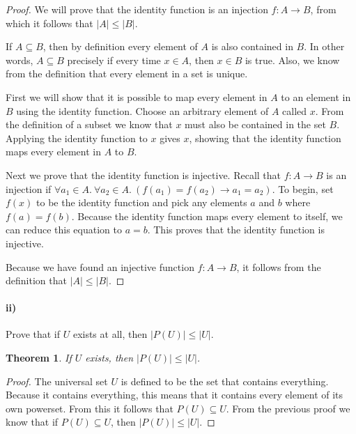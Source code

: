 \documentclass[10pt,letter]{article}
\newtheorem*{thm}{Theorem}
\begin{document}
\begin{proof} We will prove that the identity function is an injection $f : A \rightarrow B$, from which it follows that $|A| \leq |B|$. 

If $A \subseteq B$, then by definition every element of $A$ is also contained in $B$. In other words, $A \subseteq B$ precisely if every time $x \in A$, then $x \in B$ is true. Also, we know from the definition that every element in a set is unique. 

First we will show that it is possible to map every element in $A$ to an element in $B$ using the identity function. Choose an arbitrary element of $A$ called $x$. From the definition of a subset we know that $x$ must also be contained in the set $B$. Applying the identity function to $x$ gives $x$, showing that the identity function maps every element in $A$ to $B$.

Next we prove that the identity function is injective. Recall that $f : A \rightarrow B$ is an injection if $\forall a_1 \in A .\ \forall a_2 \in A .\ (f(a_1) = f(a_2) \rightarrow a_1 = a_2)$. To begin, set $f(x)$ to be the identity function and pick any elements $a$ and $b$ where $f(a) = f(b)$. Because the identity function maps every element to itself, we can reduce this equation to $a = b$. This proves that the identity function is injective. 

Because we have found an injective function $f : A \rightarrow B$, it follows from the definition that $|A| \leq |B|$. 

\end{proof}

\paragraph{ii)} Prove that if $U$ exists at all, then $|P(U)| \leq |U|$.\\

\begin{thm} If $U$ exists, then $|P(U)| \leq |U|$.
\end{thm}

\begin{proof} The universal set $U$ is defined to be the set that contains everything. Because it contains everything, this means that it contains every element of its own powerset. From this it follows that $P(U) \subseteq U$. From the previous proof we know that if $P(U) \subseteq U$, then $|P(U)| \leq |U|$. 
\end{proof}
\end{document}
